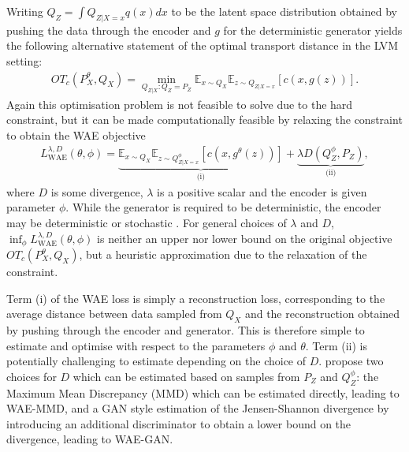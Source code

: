 Writing $Q_Z = \int Q_{Z|X=x} q(x) dx$ to be the latent space distribution obtained by pushing the data through the encoder and $g$ for the deterministic generator yields the following alternative statement of the optimal transport distance in the LVM setting:
%
\begin{align}\label{eq:ot-objective-constrained}
OT_c(P_X^\theta, Q_X) = \min_{Q_{Z|X}: Q_Z = P_Z} \mathbb{E}_{x\sim Q_X} \mathbb{E}_{z\sim Q_{Z|X=x}} \left[ c(x, g(z)) \right].
\end{align}
%
Again this optimisation problem is not feasible to solve due to the hard constraint, 
but it can be made computationally feasible by relaxing the constraint to obtain the WAE objective
%
\begin{align}\label{eq:wae-objective-relaxed}
L_{\text{WAE}}^{\lambda, D}(\theta, \phi) = \underbrace{\mathbb{E}_{x\sim Q_X} \mathbb{E}_{z\sim Q^\phi_{Z|X=x}} \left[ c(x, g^\theta(z)) \right]}_{\text{(i)}} + \underbrace{\lambda D\left(Q^\phi_Z, P_Z  \right)}_{\text{(ii)}},
\end{align}
%
where $D$ is some divergence, $\lambda$ is a positive scalar and the encoder is given parameter $\phi$.
While the generator is required to be deterministic, the encoder may be deterministic or stochastic \citep{rubenstein2018latent}.
For general choices of $\lambda$ and $D$, $\inf_{\phi} L_{\text{WAE}}^{\lambda, D}(\theta, \phi)$ is neither an upper nor lower bound on the original objective $OT_c(P_X^\theta, Q_X)$, but a heuristic approximation due to the relaxation of the constraint. 


Term (i) of the WAE loss is simply a reconstruction loss, corresponding to the average distance between data sampled from $Q_X$ and the reconstruction obtained by pushing through the encoder and generator.
This is therefore simple to estimate and optimise with respect to the parameters $\phi$ and $\theta$.
Term (ii) is potentially challenging to estimate depending on the choice of $D$. 
\cite{tolstikhin2017wasserstein} propose two choices for $D$ which can be estimated based on samples from $P_Z$ and $Q_Z^\phi$: the Maximum Mean Discrepancy (MMD) \citep{gretton2012kernel} which can be estimated directly, leading to WAE-MMD, and a GAN style estimation of the Jensen-Shannon divergence by introducing an additional discriminator to obtain a lower bound on the divergence, leading to WAE-GAN. 

